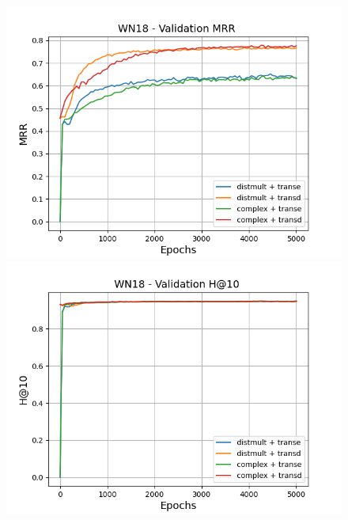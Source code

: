 \begin{figure}[H]
    \centering
    \begin{minipage}{.5\textwidth}
      \centering
      \includegraphics[width=\linewidth]{figures/results/gan_train/pretrained/random/wn18/gan_train_random_wn18_mrrs.png}
    \end{minipage}%
    \begin{minipage}{.5\textwidth}
      \centering
      \includegraphics[width=\linewidth]{figures/results/gan_train/pretrained/random/wn18/gan_train_random_wn18_hit10s.png}
    \end{minipage}
    

\end{figure}
